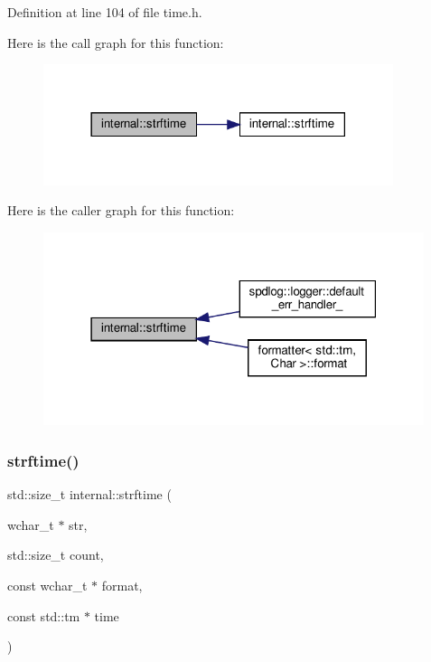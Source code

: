 Definition at line 104 of file time.\+h.

Here is the call graph for this function\+:
\nopagebreak
\begin{figure}[H]
\begin{center}
\leavevmode
\includegraphics[width=290pt]{namespaceinternal_a1358037a310a2e6f3d05538df58ff412_cgraph}
\end{center}
\end{figure}
Here is the caller graph for this function\+:
\nopagebreak
\begin{figure}[H]
\begin{center}
\leavevmode
\includegraphics[width=316pt]{namespaceinternal_a1358037a310a2e6f3d05538df58ff412_icgraph}
\end{center}
\end{figure}
\mbox{\label{namespaceinternal_aaa347e326b504b866752fd087f46d2b0}} 
\subsubsection{\texorpdfstring{strftime()}{strftime()}\hspace{0.1cm}{\footnotesize\ttfamily [2/2]}}
{\footnotesize\ttfamily std\+::size\+\_\+t internal\+::strftime (\begin{DoxyParamCaption}\item[{wchar\+\_\+t $\ast$}]{str,  }\item[{std\+::size\+\_\+t}]{count,  }\item[{const wchar\+\_\+t $\ast$}]{format,  }\item[{const std\+::tm $\ast$}]{time }\end{DoxyParamCaption})\hspace{0.3cm}{\ttfamily [inline]}}



